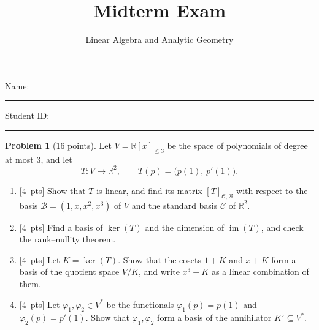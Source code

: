 \documentclass[11pt]{article}
\title{Midterm Exam}
\author{Linear Algebra and Analytic Geometry}
\date{}
\theoremstyle{definition}
\newtheorem{problem}{Problem}
\newcommand{\pts}[1]{\textup{[#1~pts]}}
\DeclareMathOperator{\im}{im}
\begin{document}
\maketitle
\thispagestyle{empty}

\noindent Name: \rule{7cm}{0.4pt} \hfill Student ID: \rule{4cm}{0.4pt}

\medskip
\noindent{}

\bigskip

\begin{problem}[16 points]\label{pr:mid-linear-map}
    Let $V = \mathbb{R}[x]_{\leq 3}$ be the space of polynomials of degree at most $3$, and let
    \[T: V \to \mathbb{R}^2, \qquad T(p) = \big(p(1), \, p'(1)\big).\]
    \begin{enumerate}[label=(\alph*)]
        \item \pts{4} Show that $T$ is linear, and find its matrix $[T]_{\mathcal{C}, \mathcal{B}}$ with respect to the basis $\mathcal{B} = (1, x, x^2, x^3)$ of $V$ and the standard basis $\mathcal{C}$ of $\mathbb{R}^2$.
        \item \pts{4} Find a basis of $\ker(T)$ and the dimension of $\im(T)$, and check the rank--nullity theorem.
        \item \pts{4} Let $K = \ker(T)$. Show that the cosets $1 + K$ and $x + K$ form a basis of the quotient space $V/K$, and write $x^3 + K$ as a linear combination of them.
        \item \pts{4} Let $\varphi_1, \varphi_2 \in V^*$ be the functionals $\varphi_1(p) = p(1)$ and $\varphi_2(p) = p'(1)$. Show that $\varphi_1, \varphi_2$ form a basis of the annihilator $K^\circ \subseteq V^*$.
    \end{enumerate}
\end{problem}
\end{document}
